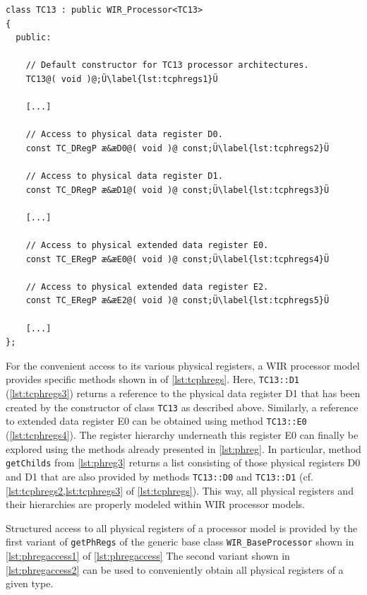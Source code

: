 \begin{lstlisting}[style=code,float=t,caption={Physical Register Handling (here for Class \texttt{TC13})},label=lst:tcphregs]
class TC13 : public WIR_Processor<TC13>
{
  public:

    // Default constructor for TC13 processor architectures.
    TC13@( void )@;Ü\label{lst:tcphregs1}Ü

    [...]

    // Access to physical data register D0.
    const TC_DRegP æ&æD0@( void )@ const;Ü\label{lst:tcphregs2}Ü

    // Access to physical data register D1.
    const TC_DRegP æ&æD1@( void )@ const;Ü\label{lst:tcphregs3}Ü

    [...]

    // Access to physical extended data register E0.
    const TC_ERegP æ&æE0@( void )@ const;Ü\label{lst:tcphregs4}Ü

    // Access to physical extended data register E2.
    const TC_ERegP æ&æE2@( void )@ const;Ü\label{lst:tcphregs5}Ü

    [...]
};
\end{lstlisting}

For the convenient access to its various physical registers, a \gls{WIR} processor model provides specific methods shown in  of \cref{lst:tcphregs}.
Here, \texttt{TC13::D1} (\cref{lst:tcphregs3}) returns a reference to the physical data register D1 that has been created by the constructor of class \texttt{TC13} as described above.
Similarly, a reference to extended data register E0 can be obtained using method \texttt{TC13::E0} (\cref{lst:tcphregs4}).
The register hierarchy underneath this register E0 can finally be explored using the methods already presented in \cref{lst:phreg}.
In particular, method \texttt{getChilds} from \cref{lst:phreg3} returns a list consisting of those physical registers D0 and D1 that are also provided by methods \texttt{TC13::D0} and \texttt{TC13::D1} (cf. \cref{lst:tcphregs2,lst:tcphregs3} of \cref{lst:tcphregs}).
This way, all physical registers and their hierarchies are properly modeled within \gls{WIR} processor models.

Structured access to all physical registers of a processor model is provided by the first variant of \texttt{getPhRegs} of the generic base class \texttt{WIR\_Base\-Processor} shown in \cref{lst:phregaccess1} of \cref{lst:phregaccess}
The second variant shown in \cref{lst:phregaccess2} can be used to conveniently obtain all physical registers of a given type.

